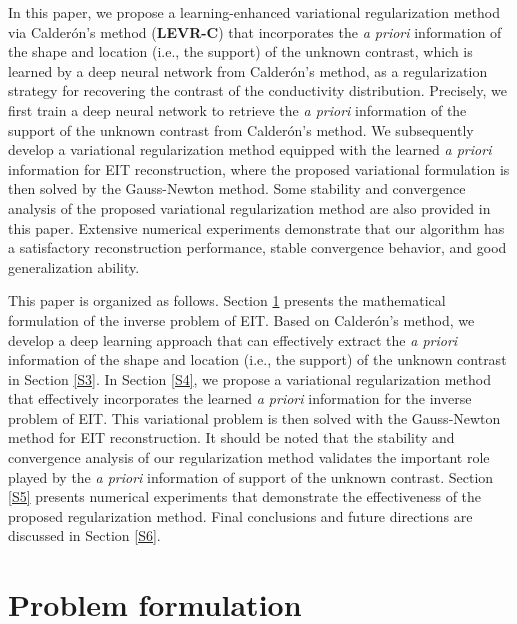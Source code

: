 \documentclass[11pt]{article}
\newcommand{\Calderon}{Calder\'{o}n}
\begin{document}
In this paper, we propose a learning-enhanced variational regularization method via \Calderon's method (\textbf{LEVR-C}) that incorporates the \textit{a priori} information of the shape and location (i.e., the support) of the unknown contrast, which is learned by a deep neural network from \Calderon's method, as a regularization strategy for recovering the contrast of the conductivity distribution.
Precisely, we first train a deep neural network to retrieve the \textit{a priori} information of the support of the unknown contrast from \Calderon's method.
We subsequently develop a variational regularization method equipped with the learned \textit{a priori} information for EIT reconstruction, where the proposed variational formulation is then solved by the Gauss-Newton method.
Some stability and convergence analysis of the proposed variational regularization method are also provided in this paper.
Extensive numerical experiments demonstrate that our algorithm has a satisfactory reconstruction performance, stable convergence behavior, and good generalization ability.

This paper is organized as follows. 
Section \ref{S2} presents the mathematical formulation of the inverse problem of EIT.
Based on \Calderon's method, we develop a deep learning approach that can effectively extract the \textit{a priori} information of the shape and location (i.e., the support) of the unknown contrast in Section \ref{S3}.
In Section \ref{S4}, we propose a variational regularization method that effectively incorporates the learned \textit{a priori} information for the inverse problem of EIT.
This variational problem is then solved with the Gauss-Newton method for EIT reconstruction.
It should be noted that the stability and convergence analysis of our regularization method validates the important role played by the \textit{a priori} information of support of the unknown contrast.
Section \ref{S5} presents numerical experiments that demonstrate the effectiveness of the proposed regularization method.
Final conclusions and future directions are discussed in Section \ref{S6}.

\section{Problem formulation}\label{S2}
\setcounter{equation}{0}
\end{document}
